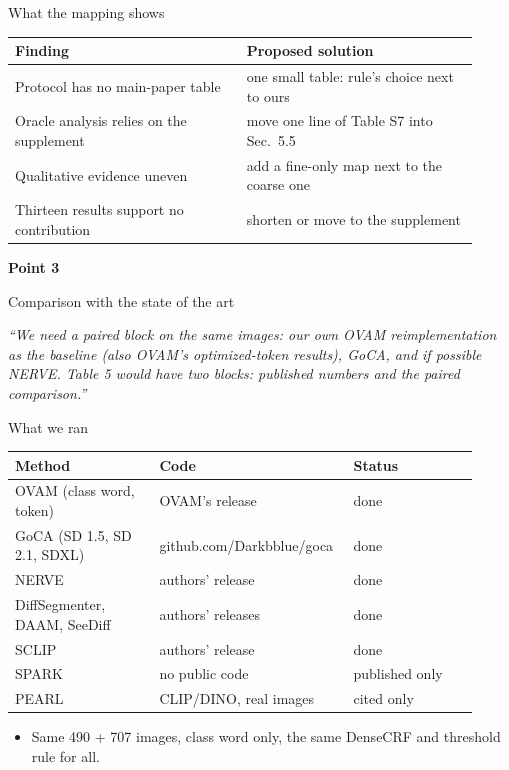 \documentclass[aspectratio=169,11pt]{beamer}
\newcommand{\pointcover}[3]{%
\begin{frame}[plain]
\vfill
\begin{center}
{\LARGE\bfseries Point #1}\par\vspace{0.6em}
{\Large #2}\par\vspace{1.4em}
\begin{minipage}{0.78\linewidth}\centering\itshape #3\end{minipage}
\end{center}
\vfill
\end{frame}}
\begin{document}
\begin{frame}{What the mapping shows}
\begin{slidetable}
\begin{tabular}{@{}L{0.46\linewidth}L{0.46\linewidth}@{}}
\toprule
Finding & Proposed solution \\
\midrule
Protocol has no main-paper table & one small table: rule's choice next to ours \\
Oracle analysis relies on the supplement & move one line of Table S7 into Sec.~5.5 \\
Qualitative evidence uneven & add a fine-only map next to the coarse one \\
Thirteen results support no contribution & shorten or move to the supplement \\
\bottomrule
\end{tabular}
\end{slidetable}
\end{frame}

\pointcover{3}{Comparison with the state of the art}{``We need a paired block on the same images: our own OVAM reimplementation as the baseline (also OVAM's optimized-token results), GoCA, and if possible NERVE. Table 5 would have two blocks: published numbers and the paired comparison.''}

\begin{frame}{What we ran}
\begin{slidetable}
\begin{tabular}{@{}L{0.30\linewidth}L{0.36\linewidth}L{0.26\linewidth}@{}}
\toprule
Method & Code & Status \\
\midrule
OVAM (class word, token) & OVAM's release & done \\
GoCA (SD 1.5, SD 2.1, SDXL) & github.com/Darkbblue/goca & done \\
NERVE & authors' release & done \\
DiffSegmenter, DAAM, SeeDiff & authors' releases & done \\
SCLIP & authors' release & done \\
SPARK & no public code & published only \\
PEARL & CLIP/DINO, real images & cited only \\
\bottomrule
\end{tabular}
\end{slidetable}
\begin{itemize}
\item Same 490 + 707 images, class word only, the same DenseCRF and threshold rule for all.
\end{itemize}
\end{frame}
\end{document}
